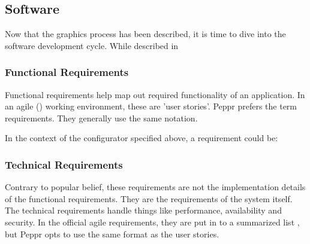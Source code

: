 \subsection{Software}
Now that the graphics process has been described, it is time to dive into the software development cycle. While described in 
​
\subsubsection{Functional Requirements}
Functional requirements help map out required functionality of an application. In an agile (\cite{agileUserStories}) working environment, these are 'user stories'. Peppr prefers the term requirements. They generally use the same notation. \newline

\newline

In the context of the configurator specified above, a requirement could be: \newline

\newline

\subsubsection{Technical Requirements}
Contrary to popular belief, these requirements are not the implementation details of the functional requirements. They are the requirements of the system itself. The technical requirements handle things like performance, availability and security. In the official agile requirements, they are put in to a summarized list \cite{agileTechnicalRequirements}, but Peppr opts to use the same format as the user stories. \newline



